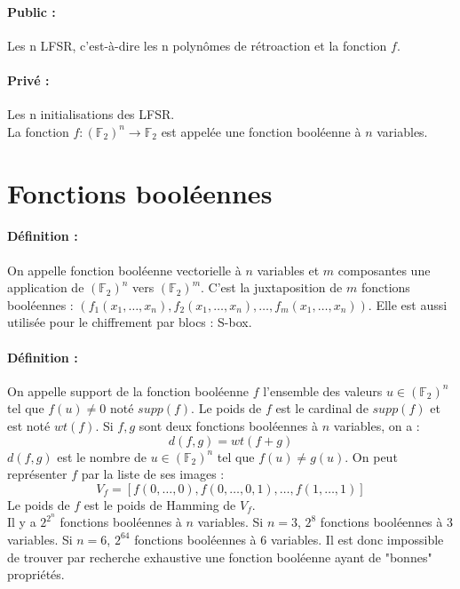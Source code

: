 \documentclass[12pt,a4paper]{report}
\begin{document}
\paragraph{Public : }
Les n LFSR, c'est-à-dire les n polynômes de rétroaction et la fonction $f$.
\paragraph{Privé : }
Les n initialisations des LFSR.\\

La fonction $f : (\mathbb{F}_2)^n \rightarrow \mathbb{F}_2$ est appelée une fonction booléenne à $n$ variables.
\section{Fonctions booléennes}

\paragraph{Définition :\\}
On appelle fonction booléenne vectorielle à $n$ variables et $m$ composantes une application de $(\mathbb{F}_2)^n$ vers $(\mathbb{F}_2)^m$. C'est la juxtaposition de $m$ fonctions booléennes : $(f_1(x_1,\ldots,x_n),f_2(x_1,\ldots,x_n),\ldots,f_m(x_1,\ldots,x_n))$. Elle est aussi utilisée pour le chiffrement par blocs : S-box.
\paragraph{Définition :\\}
On appelle support de la fonction booléenne $f$ l'ensemble des valeurs $u \in (\mathbb{F}_2)^n$ tel que $f(u)\neq 0$ noté $supp(f)$. Le poids de $f$ est le cardinal de $supp(f)$ et est noté $wt(f)$. Si $f,g$ sont deux fonctions booléennes à $n$ variables, on a :
$$ d(f,g) = wt(f+g) $$
$d(f,g)$ est le nombre de $ u \in (\mathbb{F}_2)^n $ tel que $f(u) \neq g(u)$. On peut représenter $f$ par la liste de ses images :
$$ V_f = [f(0,\ldots,0),f(0,\ldots,0,1), \ldots, f(1,\ldots,1)]$$
Le poids de $f$ est le poids de Hamming de $V_f$.\\
Il y a $2^{2^n}$ fonctions booléennes à $n$ variables. Si $n=3$, $2^8$ fonctions booléennes à 3 variables. Si $n=6$, $2^{64}$ fonctions booléennes à 6 variables. Il est donc impossible de trouver par recherche exhaustive une fonction booléenne ayant de "bonnes" propriétés.
\end{document}
